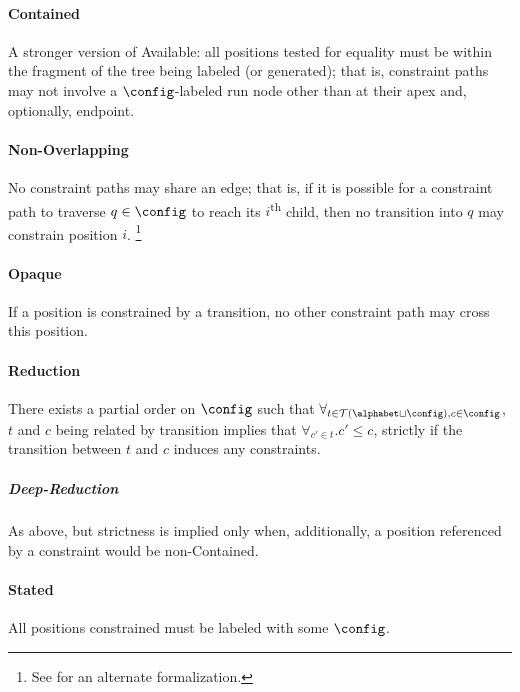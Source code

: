 \paragraph{Contained} A stronger version of Available: all positions tested
for equality must be within the fragment of the tree being labeled (or
generated); that is, constraint paths may not involve a $\config$-labeled
run node other than at their apex and, optionally, endpoint.

\paragraph{Non-Overlapping} No constraint paths may share an edge; that is,
if it is possible for a constraint path to traverse $q \in \config$ to reach
its $i$\textsuperscript{th} child, then no transition into $q$ may constrain
position $i$.%
%
\footnote{See \cite[Exercise 4.8]{tata} for an alternate formalization.}

\paragraph{Opaque} If a position is constrained by a transition, no other
constraint path may cross this position.

%

\paragraph{Reduction} There exists a partial order on $\config$ such that
$\forall_{t \in \mathcal{T}(\alphabet \sqcup \config), c \in \config}$, $t$ and
$c$ being related by transition implies that $\forall_{c' \in t} . c' \le
c$, strictly if the transition between $t$ and $c$ induces any constraints.

\subparagraph{Deep-Reduction} As above, but strictness is implied only when,
additionally, a position referenced by a constraint would be non-Contained.

\paragraph{Stated} All positions constrained must be labeled with some 
$\config$.

